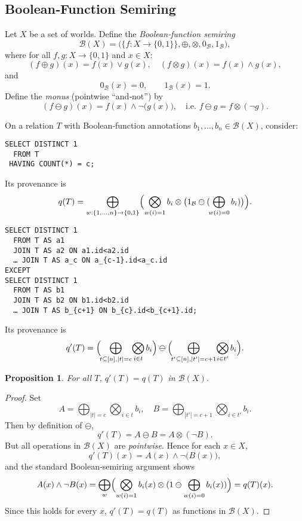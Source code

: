 \documentclass{article}
\newtheorem{proposition}{Proposition}
\begin{document}
\subsection*{Boolean‐Function Semiring}

Let \(X\) be a set of worlds.  Define the \emph{Boolean‐function semiring}
\[
  \mathcal{B}(X)
  = \bigl(\{f : X \to \{0,1\}\},\oplus,\otimes,0_{\mathcal{B}},1_{\mathcal{B}}\bigr),
\]
where for all \(f,g: X\to\{0,1\}\) and \(x\in X\):
\[
  (f\oplus g)(x) = f(x)\vee g(x),
  \quad
  (f\otimes g)(x) = f(x)\wedge g(x),
\]
and
\[
  0_{\mathcal{B}}(x)=0,\qquad 1_{\mathcal{B}}(x)=1.
\]
Define the \emph{monus} (pointwise ``and‐not'') by
\[
  (f\ominus g)(x)
  = f(x)\wedge\neg\bigl(g(x)\bigr),
  \quad
  \text{i.e.\ }f\ominus g = f\otimes(\neg g).
\]

\medskip
On a relation \(T\) with Boolean‐function annotations \(b_1,\dots,b_n\in\mathcal{B}(X)\), consider:

\begin{verbatim}
SELECT DISTINCT 1
  FROM T
 HAVING COUNT(*) = c;
\end{verbatim}

Its provenance is
\[
  q(T)
  = \bigoplus_{w:\{1,\dots,n\}\to\{0,1\}}
    \Bigl(\bigotimes_{w(i)=1}b_i
           \otimes
           \bigl(1_{\mathcal{B}}\ominus(\!\bigoplus_{w(i)=0}b_i)\bigr)
    \Bigr).
\]

\begin{verbatim}
SELECT DISTINCT 1
  FROM T AS a1
  JOIN T AS a2 ON a1.id<a2.id 
  … JOIN T AS a_c ON a_{c-1}.id<a_c.id
EXCEPT
SELECT DISTINCT 1
  FROM T AS b1
  JOIN T AS b2 ON b1.id<b2.id 
  … JOIN T AS b_{c+1} ON b_{c}.id<b_{c+1}.id;
\end{verbatim}

Its provenance is
\[
  q'(T)
  = \Bigl(\!\bigoplus_{t\subseteq[n],|t|=c}\!\bigotimes_{i\in t}b_i\Bigr)
    \ominus
    \Bigl(\!\bigoplus_{t'\subseteq[n],|t'|=c+1}\!\bigotimes_{i\in t'}b_i\Bigr).
\]

\begin{proposition}
For all \(T\), \(q'(T)=q(T)\) in \(\mathcal{B}(X)\).
\end{proposition}

\begin{proof}
Set
\[
  A = \bigoplus_{|t|=c}\bigotimes_{i\in t}b_i,
  \quad
  B = \bigoplus_{|t'|=c+1}\bigotimes_{i\in t'}b_i.
\]
Then by definition of \(\ominus\),
\[
  q'(T) = A \ominus B = A \otimes (\neg B).
\]
But all operations in \(\mathcal{B}(X)\) are \emph{pointwise}.  Hence for each \(x\in X\),
\[
  q'(T)(x)
  = A(x)\wedge\neg\bigl(B(x)\bigr),
\]
and the standard Boolean‐semiring argument shows
\[
  A(x)\wedge\neg B(x)
  = \bigoplus_{w}\Bigl(\bigotimes_{w(i)=1}b_i(x)
                      \otimes
                      (1\ominus\bigoplus_{w(i)=0}b_i(x))\Bigr)
  = q(T)(x).
\]
Since this holds for every \(x\), \(q'(T)=q(T)\) as functions in \(\mathcal{B}(X)\).
\end{proof}
\end{document}
